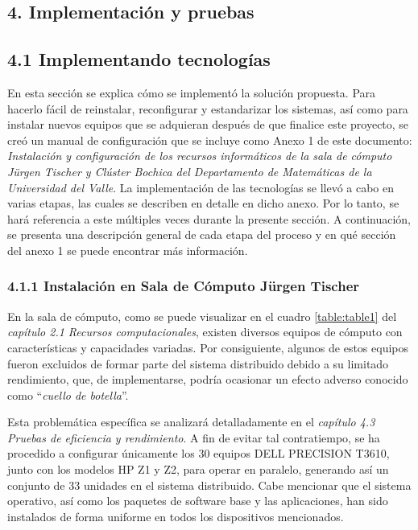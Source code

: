 \begin{spacing}{1.5}
  \begin{tightcenter}
    \section{4. Implementación y pruebas}
    \mylinespacing
  \end{tightcenter}

  \subsection{4.1 Implementando tecnologías}
  \label{chap:4.1}
  En esta sección se explica cómo se implementó la solución propuesta. Para hacerlo fácil de reinstalar, reconfigurar y estandarizar los sistemas, así como para instalar nuevos equipos que se adquieran después de que finalice este proyecto, se creó un manual de configuración que se incluye como Anexo 1 de este documento: \textit{Instalación y configuración de los recursos informáticos de la sala de cómputo Jürgen Tischer y Clúster Bochica del Departamento de Matemáticas de la Universidad del Valle}. La implementación de las tecnologías se llevó a cabo en varias etapas, las cuales se describen en detalle en dicho anexo. Por lo tanto, se hará referencia a este múltiples veces durante la presente sección. A continuación, se presenta una descripción general de cada etapa del proceso y en qué sección del anexo 1 se puede encontrar más información.

  \subsubsection{4.1.1 Instalación en Sala de Cómputo Jürgen Tischer}

  En la sala de cómputo, como se puede visualizar en el cuadro \ref{table:table1} del \textit{capítulo 2.1 Recursos computacionales}, existen diversos equipos de cómputo con características y capacidades variadas. Por consiguiente, algunos de estos equipos fueron excluidos de formar parte del sistema distribuido debido a su limitado rendimiento, que, de implementarse, podría ocasionar un efecto adverso conocido como ``\textit{cuello de botella}''.

  Esta problemática específica se analizará detalladamente en el \textit{capítulo 4.3 Pruebas de eficiencia y rendimiento}. A fin de evitar tal contratiempo, se ha procedido a configurar únicamente los 30 equipos DELL PRECISION T3610, junto con los modelos HP Z1 y Z2, para operar en paralelo, generando así un conjunto de 33 unidades en el sistema distribuido. Cabe mencionar que el sistema operativo, así como los paquetes de software base y las aplicaciones, han sido instalados de forma uniforme en todos los dispositivos mencionados.


\end{spacing}
